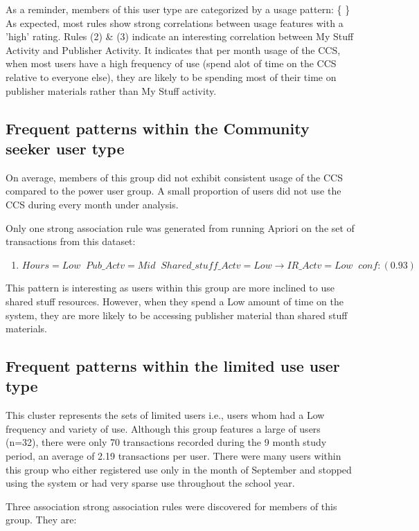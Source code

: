 \documentclass{acm_proc_article-sp}
\begin{document}
As a reminder, members of this user type  are categorized by a usage pattern: \{ \}
As expected, most rules show strong correlations between usage features with a 'high' rating.
Rules (2) \& (3) indicate an interesting correlation between My Stuff Activity and Publisher Activity. It indicates that per month usage of the CCS, when most users have a high frequency of use (spend alot of time on the CCS relative to everyone else), they are likely to be spending most of their time on publisher materials rather than My Stuff activity.

\subsection {Frequent patterns within the Community seeker user type}
On average, members of this group did not exhibit consistent usage of the CCS compared to the power user group. A small proportion of users did not use the CCS during every month under analysis.

Only one strong association rule was generated from running Apriori on the set of transactions from this dataset:

\begin{enumerate}
\item $Hours=Low \;\; Pub\_Actv=Mid \;\; Shared\_stuff\_Actv=Low  \longrightarrow IR\_Actv=Low  \;\;  conf:(0.93)$
\end{enumerate}

This pattern is interesting as users within this group are more inclined to use shared stuff resources. However, when they spend a Low amount of time on the system, they are more likely to be accessing publisher material than shared stuff materials.

\subsection {Frequent patterns within the limited use user type}
This cluster represents the sets of limited users i.e., users whom had a Low frequency and variety of use. 
Although this group features a large of users (n=32), there were only 70 transactions recorded during the 9 month study period, an average of 2.19 transactions per user. There were many users within this group who either registered use only in the month of September and stopped using the system or had very sparse use throughout the school year.

Three association strong association rules were discovered for members of this group. They are:
\end{document}
